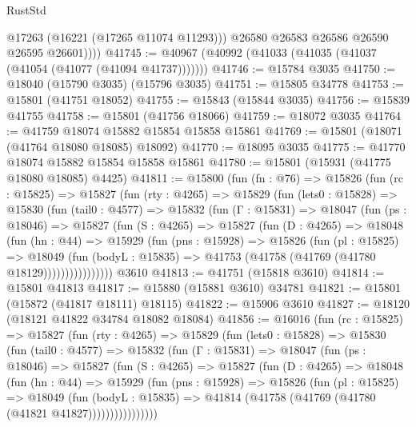 \begin{lexlean}{RustStd}
\begin{coremodule}
              @17263
              (@16221 (@17265 @11074 @11293)))
            @26580
            @26583
            @26586
            @26590
            @26595
            @26601))))
@41745 := @40967 (@40992 (@41033 (@41035 (@41037 (@41054 (@41077 (@41094 @41737)))))))
@41746 := @15784 @3035
@41750 := @18040 (@15790 @3035) (@15796 @3035)
@41751 := @15805 @34778
@41753 := @15801 (@41751 @18052)
@41755 := @15843 (@15844 @3035)
@41756 := @15839 @41755
@41758 := @15801 (@41756 @18066)
@41759 := @18072 @3035
@41764 := @41759 @18074 @15882 @15854 @15858 @15861
@41769 := @15801 (@18071 (@41764 @18080 @18085) @18092)
@41770 := @18095 @3035
@41775 := @41770 @18074 @15882 @15854 @15858 @15861
@41780 := @15801 (@15931 (@41775 @18080 @18085) @4425)
@41811 := @15800
    (fun (fn : @76) =>
    @15826
      (fun (rc : @15825) =>
      @15827
        (fun (rty : @4265) =>
        @15829
          (fun (lets0 : @15828) =>
          @15830
            (fun (tail0 : @4577) =>
            @15832
              (fun (Γ : @15831) =>
              @18047
                (fun (ps : @18046) =>
                @15827
                  (fun (S : @4265) =>
                  @15827
                    (fun (D : @4265) =>
                    @18048
                      (fun (hn : @44) =>
                      @15929
                        (fun (pns : @15928) =>
                        @15826
                          (fun (pl : @15825) =>
                          @18049
                            (fun (bodyL : @15835) =>
                            @41753 (@41758 (@41769 (@41780 @18129))))))))))))))))
    @3610
@41813 := @41751 (@15818 @3610)
@41814 := @15801 @41813
@41817 := @15880 (@15881 @3610) @34781
@41821 := @15801 (@15872 (@41817 @18111) @18115)
@41822 := @15906 @3610
@41827 := @18120 (@18121 @41822 @34784 @18082 @18084)
@41856 := @16016
    (fun (rc : @15825) =>
    @15827
      (fun (rty : @4265) =>
      @15829
        (fun (lets0 : @15828) =>
        @15830
          (fun (tail0 : @4577) =>
          @15832
            (fun (Γ : @15831) =>
            @18047
              (fun (ps : @18046) =>
              @15827
                (fun (S : @4265) =>
                @15827
                  (fun (D : @4265) =>
                  @18048
                    (fun (hn : @44) =>
                    @15929
                      (fun (pns : @15928) =>
                      @15826
                        (fun (pl : @15825) =>
                        @18049
                          (fun (bodyL : @15835) =>
                          @41814 (@41758 (@41769 (@41780 (@41821 @41827))))))))))))))))

\end{coremodule}
\end{lexlean}
